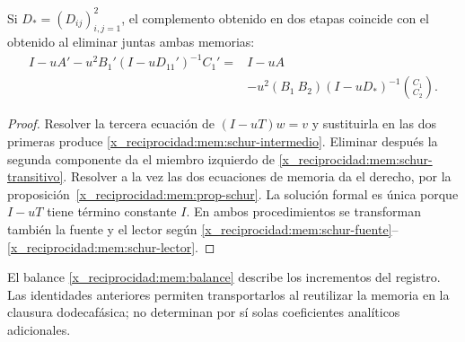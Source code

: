 \begin{proposition}
Si \(D_*=(D_{ij})_{i,j=1}^2\), el complemento obtenido en dos etapas
coincide con el obtenido al eliminar juntas ambas memorias:
\begin{equation}
 \begin{split}
 I-uA'-u^2B_1'(I-uD_{11}')^{-1}C_1'
 ={}&I-uA\\
 &-u^2(B_1\ B_2)(I-uD_*)^{-1}\binom{C_1}{C_2}.
 \end{split}
 \label{x_reciprocidad:mem:schur-transitivo}
\end{equation}
\end{proposition}
\begin{proof}
Resolver la tercera ecuación de \((I-uT)w=v\) y sustituirla en las
dos primeras produce \eqref{x_reciprocidad:mem:schur-intermedio}. Eliminar después la
segunda componente da el miembro izquierdo de
\eqref{x_reciprocidad:mem:schur-transitivo}. Resolver a la vez las dos ecuaciones de
memoria da el derecho, por la proposición~\ref{x_reciprocidad:mem:prop-schur}.
La solución formal es única porque \(I-uT\) tiene término constante
\(I\). En ambos procedimientos se transforman también la fuente y
el lector según \eqref{x_reciprocidad:mem:schur-fuente}--\eqref{x_reciprocidad:mem:schur-lector}.
\end{proof}

El balance \eqref{x_reciprocidad:mem:balance} describe los incrementos del registro.
Las identidades anteriores permiten transportarlos al reutilizar la memoria
en la clausura dodecafásica; no determinan por sí solas coeficientes
analíticos adicionales.


